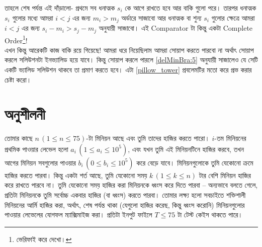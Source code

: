 \begin{solution}
\begin{equation}
\end{equation}
তাহলে শেষ পর্যন্ত এই দাঁড়ালো- প্রথমে সব ধনাত্মক $s_i$ কে আগে রাখতে হবে আর বাকি গুলো পরে। তারপর ধনাত্মক $s_i$ গুলোর মধ্যে আমরা $i < j$ এর জন্য $m_i > m_j$ অর্ডারে সাজাবো আর ধনাত্মক বা শুন্য $s_i$ গুলোর ক্ষেত্রে আমরা $i < j$ এর জন্য $s_i - m_i > s_j - m_j$ অনুযায়ী সাজাবো। এই Comparator টা কিন্তু একটা Complete Order\footnote{ভেরিফাই করে দেখো।}!\\
এখন কিন্তু আরেকটি কাজ বাকি রয়ে গিয়েছে! আমরা ধরে নিয়েছিলাম আমরা সোয়াপ করতে পারবো না অর্থাৎ সোয়াপ করলে সলিউশনটা ইনভ্যালিড হয়ে যাবে। কিন্তু সোয়াপ করলে পারলে \eqref{delMinBra:5} অনুযায়ী সাজালেও যে সেটি একটি ভ্যালিড সলিউশন থাকবে তা প্রমাণ করতে হবে। এটা \ref{pillow_tower} প্রবলেমটির মতো করে প্রভ করার চেষ্টা করো।
\end{solution}

\section{অনুশীলনী}

\begin{exercise}
তোমার কাছে $n \, (1 \le n \le 75)$-টা মিনিয়ন আছে এবং তুমি তাদের হাজির করতে পারো। $i$-তম মিনিয়নের প্রথমিক পাওয়ার লেভেল হলো $a_i \, (1 \le a_i \le 10^5)$, এবং যখন তুমি এই মিনিয়নটিনে হাজির করবে, তখন আগের মিনিয়ন সবগুলোর পাওয়ার $b_i \, (0 \le b_i \le 10^5)$ করে বেড়ে যাবে। মিনিয়নগুলোকে তুমি যেকোনো ক্রমে হাজির করতে পারবা। কিন্তু একটা শর্ত আছে, তুমি যেকোনো সময় $k \, (1 \le k \le n)$ টার বেশি মিনিয়ন হাজির করে রাখতে পারবে না। তুমি যেকোনো সময় হাজির করা মিনিয়নকে ধ্বংস করে দিতে পারবা -- অন্যভাবে বলতে গেলে, প্রতিটা মিনিয়নকে তুমি সর্বোচ্চ একবার হাজির (বা ধ্বংস) করতে পারবা। তোমার লক্ষ্য হলো সবচাইতে শক্তিশালী মিনিয়নের আর্মি হাজির করা, অর্থাৎ, শেষ পর্যন্ত থাকা (যেগুলো হাজির করেছ, কিন্তু ধ্বংস করোনি) মিনিয়নগুলোর পাওয়ার লেভেলের যোগফল ম্যাক্সিমাইজ করা। প্রতিটা ইনপুট ফাইলে $T \le 75$ টা টেস্ট কেইস থাকতে পারে।
\end{exercise}
